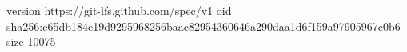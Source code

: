 version https://git-lfs.github.com/spec/v1
oid sha256:c65db184e19d9295968256baac82954360646a290daa1d6f159a97905967c0b6
size 10075
